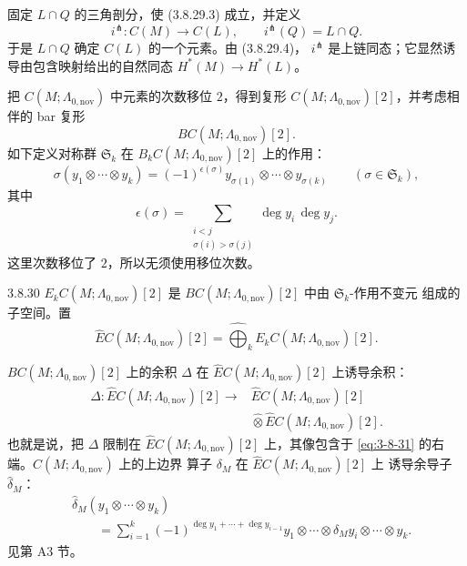 固定 $L\cap Q$ 的三角剖分，使 (3.8.29.3) 成立，并定义
\[
 i^\pitchfork\colon C(M)\longrightarrow C(L),
 \qquad i^\pitchfork(Q)=L\cap Q.
\]
于是 $L\cap Q$ 确定 $C(L)$ 的一个元素。由 (3.8.29.4)，
$i^\pitchfork$ 是上链同态；它显然诱导由包含映射给出的自然同态
$H^*(M)\to H^*(L)$。

把 $C(M;\Lambda_{0,\mathrm{nov}})$ 中元素的次数移位 $2$，得到复形
$C(M;\Lambda_{0,\mathrm{nov}})[2]$，并考虑相伴的 bar 复形
\[
 BC(M;\Lambda_{0,\mathrm{nov}})[2].
\]
如下定义对称群 $\mathfrak S_k$ 在
$B_kC(M;\Lambda_{0,\mathrm{nov}})[2]$ 上的作用：
\[
 \sigma(y_1\otimes\cdots\otimes y_k)
 =
 (-1)^{\epsilon(\sigma)}
 y_{\sigma(1)}\otimes\cdots\otimes y_{\sigma(k)}
 \qquad(\sigma\in\mathfrak S_k),
\]
其中
\[
 \epsilon(\sigma)
 =
 \sum_{\substack{i<j\\\sigma(i)>\sigma(j)}}
 \deg y_i\,\deg y_j.
\]
这里次数移位了 $2$，所以无须使用移位次数。

\begin{definition}{3.8.30}\label{def:3-8-30}
$E_kC(M;\Lambda_{0,\mathrm{nov}})[2]$ 是
$BC(M;\Lambda_{0,\mathrm{nov}})[2]$ 中由 $\mathfrak S_k$-作用不变元
组成的子空间。置
\[
 \widehat EC(M;\Lambda_{0,\mathrm{nov}})[2]
 =
 \widehat{\bigoplus}_k
 E_kC(M;\Lambda_{0,\mathrm{nov}})[2].
\]
\end{definition}

$BC(M;\Lambda_{0,\mathrm{nov}})[2]$ 上的余积 $\Delta$ 在
$\widehat EC(M;\Lambda_{0,\mathrm{nov}})[2]$ 上诱导余积：
\begin{equation}
\begin{aligned}
 \Delta\colon
 \widehat EC(M;\Lambda_{0,\mathrm{nov}})[2]
 \longrightarrow{}&
 \widehat EC(M;\Lambda_{0,\mathrm{nov}})[2]\\
 &{}\widehat\otimes
 \widehat EC(M;\Lambda_{0,\mathrm{nov}})[2].
\end{aligned}
\tag{3.8.31}\label{eq:3-8-31}
\end{equation}
也就是说，把 $\Delta$ 限制在
$\widehat EC(M;\Lambda_{0,\mathrm{nov}})[2]$ 上，其像包含于
\eqref{eq:3-8-31} 的右端。$C(M;\Lambda_{0,\mathrm{nov}})$ 上的上边界
算子 $\delta_M$ 在 $\widehat EC(M;\Lambda_{0,\mathrm{nov}})[2]$ 上
诱导余导子 $\widehat\delta_M$：
\[
\begin{aligned}
 &\widehat\delta_M(y_1\otimes\cdots\otimes y_k)\\
 &\qquad=
 \sum_{i=1}^k
 (-1)^{\deg y_1+\cdots+\deg y_{i-1}}
 y_1\otimes\cdots\otimes
 \delta_My_i\otimes\cdots\otimes y_k.
\end{aligned}
\]
见第 A3 节。


